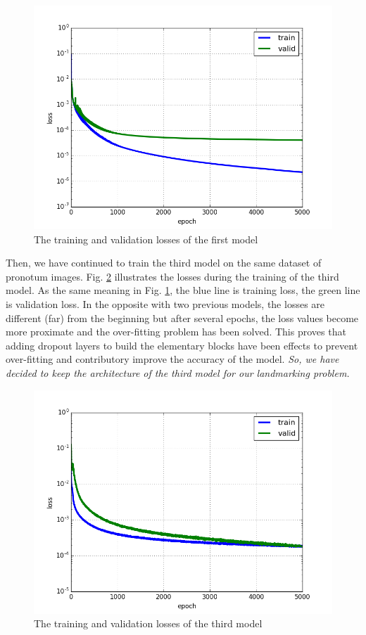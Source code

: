 \documentclass[review]{elsarticle}
\begin{document}
\begin{figure}[!h]
	\centering
	\includegraphics[scale=0.4]{images/cnnmodel3_5000_pronotum_v13_without_dropout_normalized_data_loss}
	\caption{The training and validation losses of the first model}
	\label{figloss1}
\end{figure}

Then, we have continued to train the third model on the same dataset of pronotum images. Fig. \ref{figloss2} illustrates the losses during the training of the third model. As the same meaning in Fig. \ref{figloss1}, the blue line is training loss, the green line is validation loss. In the opposite with two previous models, the losses are different (far) from the beginning but after several epochs, the loss values become more proximate and the over-fitting problem has been solved. This proves that adding dropout layers to build the elementary blocks have been effects to prevent over-fitting and contributory improve the accuracy of the model. \textit{So, we have decided to keep the architecture of the third model for our landmarking problem.}

\begin{figure}[!h]
	\centering
	\includegraphics[scale=0.4]{images/loss_v16}
	\caption{The training and validation losses of the third model}
	\label{figloss2}
\end{figure}
\end{document}
